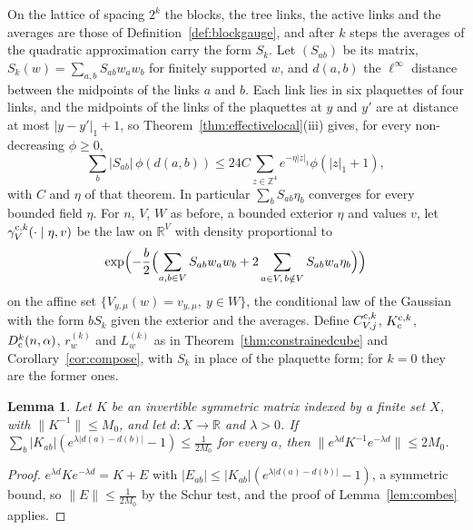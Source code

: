 \documentclass[11pt]{amsart}
\newtheorem{lemma}[theorem]{Lemma}
\theoremstyle{definition}
\theoremstyle{remark}
\numberwithin{equation}{section}
\newcommand{\R}{\mathbb{R}}
\newcommand{\Z}{\mathbb{Z}}
\begin{document}
On the lattice of spacing $2^k$ the blocks, the tree links, the active links
and the averages are those of Definition~\ref{def:blockgauge}, and after $k$
steps the averages of the quadratic approximation carry the form $S_k$. Let
$(S_{ab})$ be its matrix, $S_k(w)=\sum_{a,b}S_{ab}w_aw_b$ for finitely
supported $w$, and $d(a,b)$ the $\ell^\infty$ distance between the midpoints
of the links $a$ and $b$. Each link lies in six plaquettes of four links, and
the midpoints of the links of the plaquettes at $y$ and $y'$ are at distance
at most $|y-y'|_1+1$, so Theorem~\ref{thm:effectivelocal}(iii) gives, for
every non-decreasing $\phi\ge0$,
\begin{equation}\label{eq:Srows}
\sum_b|S_{ab}|\,\phi(d(a,b))\le24C\sum_{z\in\Z^4}e^{-\eta|z|_1}\phi(|z|_1+1),
\end{equation}
with $C$ and $\eta$ of that theorem. In particular $\sum_bS_{ab}\eta_b$
converges for every bounded field $\eta$. For $n$, $V$, $W$ as before, a
bounded exterior $\eta$ and values $v$, let $\gamma^{{\rm c},k}_V(\cdot\mid
\eta,v)$ be the law on $\R^V$ with density proportional to
\[
\exp\Bigl(-\frac b2\Bigl(\sum_{a,b\in V}S_{ab}w_aw_b+2\sum_{a\in V,\,b\notin
V}S_{ab}w_a\eta_b\Bigr)\Bigr)
\]
on the affine set $\{V_{y,\mu}(w)=v_{y,\mu},\ y\in W\}$, the conditional law
of the Gaussian with the form $bS_k$ given the exterior and the averages.
Define $C^{{\rm c},k}_{V,j}$, $K^{{\rm c},k}_c$, $D^k_{\rm c}(n,\alpha)$,
$r^{(k)}_w$ and $L^{(k)}_w$ as in Theorem~\ref{thm:constrainedcube} and
Corollary~\ref{cor:compose}, with $S_k$ in place of the plaquette form; for
$k=0$ they are the former ones.

\begin{lemma}\label{lem:combeslong}
Let $K$ be an invertible symmetric matrix indexed by a finite set $X$, with
$\|K^{-1}\|\le M_0$, and let $d:X\to\R$ and $\lambda>0$. If $\sum_b|K_{ab}|
(e^{\lambda|d(a)-d(b)|}-1)\le\frac1{2M_0}$ for every $a$, then $\|e^{\lambda
d}K^{-1}e^{-\lambda d}\|\le2M_0$.
\end{lemma}

\begin{proof}
$e^{\lambda d}Ke^{-\lambda d}=K+E$ with $|E_{ab}|\le|K_{ab}|(e^{\lambda|d(a)-
d(b)|}-1)$, a symmetric bound, so $\|E\|\le\frac1{2M_0}$ by the Schur test,
and the proof of Lemma~\ref{lem:combes} applies.
\end{proof}
\end{document}

